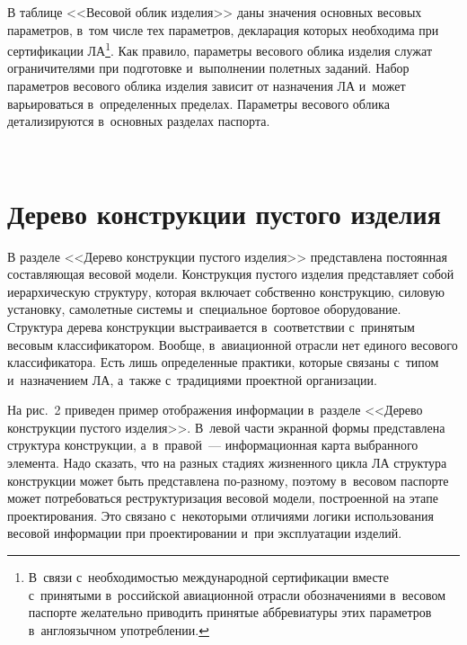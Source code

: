 \begin{multicols}{2}
  В таблице <<Весовой облик изделия>> даны значения основных весовых 
параметров, в~том числе тех параметров, декларация которых необходима при 
сертификации ЛА\footnote{В~связи с~необходимостью международной сертификации 
вместе с~принятыми в~российской авиационной отрасли обозначениями в~весовом паспорте 
желательно приводить принятые аббревиатуры этих параметров в~англоязычном 
употреблении.}. Как правило, параметры весового облика изделия служат 
ограничителями при подготовке и~выполнении полетных заданий. Набор 
параметров весового облика изделия зависит от назначения ЛА и~может 
варьироваться в~определенных пределах. Параметры весового облика 
детализируются в~основных разделах паспорта.

\begin{figure*} %
\vspace*{1pt}
    \begin{center}  
  \mbox{%
 \epsfxsize=163mm 
 }
\end{center}
\vspace*{-10pt}
\vspace*{-3pt}
\end{figure*}
  
  
\vspace*{-7pt}
  
\section{Дерево конструкции пустого изделия }

\vspace*{-4pt}

  В разделе <<Дерево конструкции пустого изделия>> представлена 
постоянная составляющая весовой модели. Конструкция пустого изделия 
представляет собой иерархическую структуру, которая включает собственно 
конструкцию, силовую установку, самолетные системы и~специальное бортовое 
оборудование. Структура дерева конструкции выстраивается в~соответствии 
с~принятым весовым классификатором. Вообще, в~авиационной отрасли нет 
единого весового классификатора. Есть лишь определенные практики, которые 
связаны с~типом и~назначением ЛА, а~также с~традициями 
проектной организации. 

На рис.~2 приведен пример отображения информации 
в~разделе <<Дерево конструкции пустого изделия>>.
В~левой части экранной формы представлена структура конструкции, 
а~в~правой~--- информационная карта выбранного элемента. Надо сказать, что 
на разных стадиях жизненного цик\-ла ЛА структура конструкции может быть 
представлена по-раз\-но\-му, поэтому в~весовом паспорте может потребоваться 
реструктуризация весовой модели, построенной на этапе проектирования. Это 
связано с~некоторыми отличиями логики использования весовой информации 
при проектировании и~при эксплуатации изделий.
  

\end{multicols}
